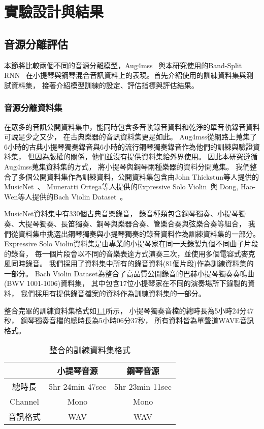 \documentclass[class=NCU_thesis, crop=false]{standalone}
\begin{document}
\chapter{實驗設計與結果}

\section{音源分離評估}
本節將比較兩個不同的音源分離模型，Aug4mss~\cite{Chiu_ChingYu2020MixingSpecific}
與本研究使用的Band-Split RNN~\cite{Luo_Yi2022MusicSourceSeparation}
在小提琴與鋼琴混合音訊資料上的表現。首先介紹使用的訓練資料集與測試資料集，
接著介紹模型訓練的設定、評估指標與評估結果。

\subsection{音源分離資料集}
在眾多的音訊公開資料集中，能同時包含多音軌錄音資料和乾淨的單音軌錄音資料可說是少之又少，
在古典樂器的音訊資料集更是如此。
Aug4mss從網路上蒐集了
6小時的古典小提琴獨奏錄音與6小時的流行鋼琴獨奏錄音作為他們的訓練與驗證資料集，
但因為版權的關係，他們並沒有提供資料集給外界使用。
因此本研究遵循Aug4mss蒐集資料集的方式，
將小提琴與鋼琴兩種樂器的資料分開蒐集。
我們整合了多個公開資料集作為訓練資料，公開資料集包含由John Thickstun等人提供的
MusicNet~\cite{Thickstun2017Learning, Thickstun2018Invariances}、
Muneratti Ortega等人提供的Expressive Solo Violin~\cite{Muneratti_Ortega2021Expressive}與
Dong, Hao-Wen等人提供的Bach Violin Dataset~\cite{Dong_HaoWen2021Bach}。

MusicNet資料集中有330個古典音樂錄音，
錄音種類包含鋼琴獨奏、小提琴獨奏、大提琴獨奏、長笛獨奏、鋼琴與樂器合奏、管樂合奏與弦樂合奏等組合，
我們從資料集中挑選出鋼琴獨奏與小提琴獨奏的錄音資料作為訓練資料集的一部分。
Expressive Solo Violin資料集是由專業的小提琴家在同一天錄製九個不同曲子片段的錄音，
每一個片段會以不同的音樂表達方式演奏三次，並使用多個電容式麥克風同時錄音。
我們採用了資料集中所有的錄音資料(81個片段)作為訓練資料集的一部分。
Bach Violin Dataset為整合了高品質公開錄音的巴赫小提琴獨奏奏鳴曲(BWV 1001-1006)資料集，
其中包含17位小提琴家在不同的演奏場所下錄製的資料，
我們採用有提供錄音檔案的資料作為訓練資料集的一部分。

整合完畢的訓練資料集格式如\cref{table:table-ours-training-dataset}所示，
小提琴獨奏音檔的總時長為5小時24分47秒，
鋼琴獨奏音檔的總時長為5小時06分37秒，
所有資料皆為單聲道WAVE音訊格式。
\begin{table}[h]
    \centering
    \caption{整合的訓練資料集格式}
    \label{table:table-ours-training-dataset}
    \begin{tabular}{|c|c|c|}
        \hline
        \multicolumn{1}{|c|}{} & \multicolumn{1}{|c|}{小提琴音源} & \multicolumn{1}{|c|}{鋼琴音源} \\
        \hline
        總時長 & 5hr 24min 47sec & 5hr 23min 11sec \\
        \hline
        Channel & Mono & Mono \\
        \hline
        音訊格式 & WAV & WAV \\
        \hline
    \end{tabular}
\end{table}
\end{document}
